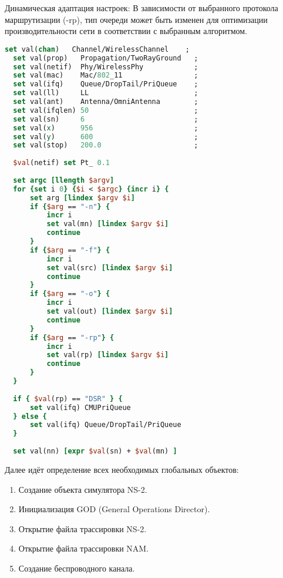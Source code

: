 Динамическая адаптация настроек: В зависимости от выбранного протокола маршрутизации (-rp), тип очереди может быть изменен для оптимизации производительности сети в соответствии с выбранным алгоритмом.

\begin{lstlisting}[language=tcl, style=mystyle, caption=Конфигурация сети в NS-2]
  set val(chan)   Channel/WirelessChannel    ;
  set val(prop)   Propagation/TwoRayGround   ;
  set val(netif)  Phy/WirelessPhy            ;
  set val(mac)    Mac/802_11                 ;
  set val(ifq)    Queue/DropTail/PriQueue    ;
  set val(ll)     LL                         ;
  set val(ant)    Antenna/OmniAntenna        ;
  set val(ifqlen) 50                         ;
  set val(sn)     6                          ;
  set val(x)      956                        ;
  set val(y)      600                        ;
  set val(stop)   200.0                      ;
  
  $val(netif) set Pt_ 0.1
  
  set argc [llength $argv]
  for {set i 0} {$i < $argc} {incr i} {
      set arg [lindex $argv $i]
      if {$arg == "-n"} {
          incr i
          set val(mn) [lindex $argv $i]
          continue
      }
      if {$arg == "-f"} {
          incr i
          set val(src) [lindex $argv $i]
          continue
      }
      if {$arg == "-o"} {
          incr i
          set val(out) [lindex $argv $i]
          continue
      }
      if {$arg == "-rp"} {
          incr i
          set val(rp) [lindex $argv $i]
          continue
      }
  }
  
  if { $val(rp) == "DSR" } {
      set val(ifq) CMUPriQueue
  } else {
      set val(ifq) Queue/DropTail/PriQueue
  }
  
  set val(nn) [expr $val(sn) + $val(mn) ]
\end{lstlisting}
  
  Далее идёт определение всех необходимых глобальных объектов:
  
\begin{enumerate}
    \item Создание объекта симулятора NS-2.
    \item Инициализация GOD (General Operations Director).
    \item Открытие файла трассировки NS-2.
    \item Открытие файла трассировки NAM.
    \item Создание беспроводного канала.
\end{enumerate}
  
